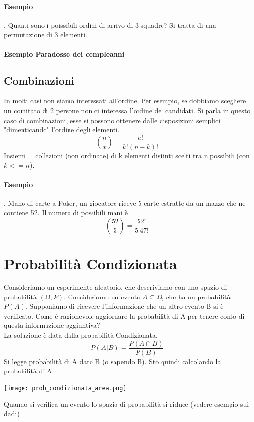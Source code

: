 \documentclass[12pt, a4paper, openany]{book}
\begin{document}
\paragraph{Esempio}. Quanti sono i poissibili ordini di arrivo di 3 squadre?
Si tratta di una permutazione di 3 elementi.
\paragraph{Esempio Paradosso dei compleanni}

\subsection{Combinazioni}
In molti casi non siamo interessati all'ordine. 
Per esempio, se dobbiamo scegliere un comitato di 2 persone non ci interessa l'ordine 
dei candidati.
Si parla in questo caso di combinazioni, esse si possono ottenere dalle disposizioni semplici
"dimenticando" l'ordine degli elementi.
\begin{equation}
    {n \choose x} = \frac{n!}{k!(n-k)!}
\end{equation}
Insiemi = collezioni (non ordinate) di k elementi distinti scelti tra n possibili (con $k <= n$).
\paragraph{Esempio}. Mano di carte a Poker, un giocatore riceve 5 carte estratte da un mazzo che
ne contiene 52. Il numero di possibili mani è
\begin{equation}
    {52 \choose 5} = \frac{52!}{5!47!}
\end{equation} 

\section{Probabilità Condizionata}
Consideriamo un esperimento aleatorio, che descriviamo con uno spazio di probabilità $(\Omega, P)$.
Consideriamo un evento $A \subseteq \Omega$, che ha un probabilità $P(A)$.
Supponiamo di ricevere l'informazione che un altro evento B si è verificato.
Come è ragionevole aggiornare la probabilità di A per tenere conto di questa informazione aggiuntiva?
\\La soluzione è data dalla probabilità Condizionata.
\begin{equation}
    P(A|B) = \frac{P(A \cap B)}{P(B)}
\end{equation}
Si legge probabilità di A dato B (o sapendo B). Sto quindi calcolando la probabilità di A.
\begin{center}
    \texttt{[image: prob\_condizionata\_area.png]}    
\end{center}
Quando si verifica un evento lo spazio di probabilità si riduce (vedere esempio sui dadi)
\end{document}
